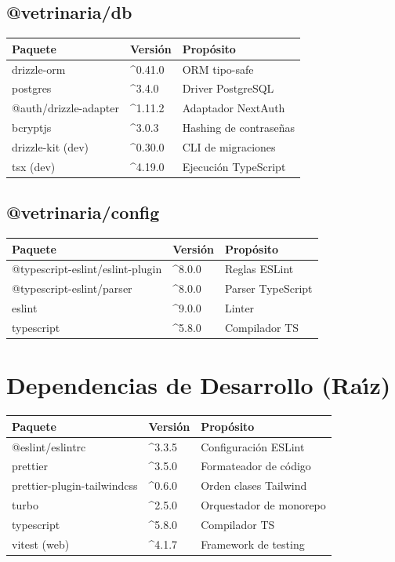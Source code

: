 \subsection{@vetrinaria/db}

\begin{longtable}{|l|l|l|}
\hline
\textbf{Paquete} & \textbf{Versi\'on} & \textbf{Prop\'osito} \\
\hline
drizzle-orm & \textasciicircum0.41.0 & ORM tipo-safe \\
postgres & \textasciicircum3.4.0 & Driver PostgreSQL \\
@auth/drizzle-adapter & \textasciicircum1.11.2 & Adaptador NextAuth \\
bcryptjs & \textasciicircum3.0.3 & Hashing de contrase\~nas \\
drizzle-kit (dev) & \textasciicircum0.30.0 & CLI de migraciones \\
tsx (dev) & \textasciicircum4.19.0 & Ejecuci\'on TypeScript \\
\hline
\end{longtable}

\subsection{@vetrinaria/config}

\begin{longtable}{|l|l|l|}
\hline
\textbf{Paquete} & \textbf{Versi\'on} & \textbf{Prop\'osito} \\
\hline
@typescript-eslint/eslint-plugin & \textasciicircum8.0.0 & Reglas ESLint \\
@typescript-eslint/parser & \textasciicircum8.0.0 & Parser TypeScript \\
eslint & \textasciicircum9.0.0 & Linter \\
typescript & \textasciicircum5.8.0 & Compilador TS \\
\hline
\end{longtable}

\section{Dependencias de Desarrollo (Ra\'{\i}z)}

\begin{longtable}{|l|l|l|}
\hline
\textbf{Paquete} & \textbf{Versi\'on} & \textbf{Prop\'osito} \\
\hline
@eslint/eslintrc & \textasciicircum3.3.5 & Configuraci\'on ESLint \\
prettier & \textasciicircum3.5.0 & Formateador de c\'odigo \\
prettier-plugin-tailwindcss & \textasciicircum0.6.0 & Orden clases Tailwind \\
turbo & \textasciicircum2.5.0 & Orquestador de monorepo \\
typescript & \textasciicircum5.8.0 & Compilador TS \\
vitest (web) & \textasciicircum4.1.7 & Framework de testing \\
\hline
\end{longtable}

